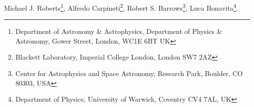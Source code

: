 Michael J. Roberts\footnote{\tiny{Department of Astronomy \& Astrophysics, Department of Physics & Astronomy, Gower Street, London, WC1E 6BT UK}}, Alfredo Carpineti\footnote{\tiny{Blackett Laboratory, Imperial College London, London SW7 2AZ}}, Robert S. Barrows\footnote{\tiny{Center for Astrophysics and Space Astronomy, Research Park, Boulder, CO 80303, USA}}, Luca Bonavita\footnote{\tiny{Department of Physics, University of Warwick, Coventry CV4 7AL, UK}}. 